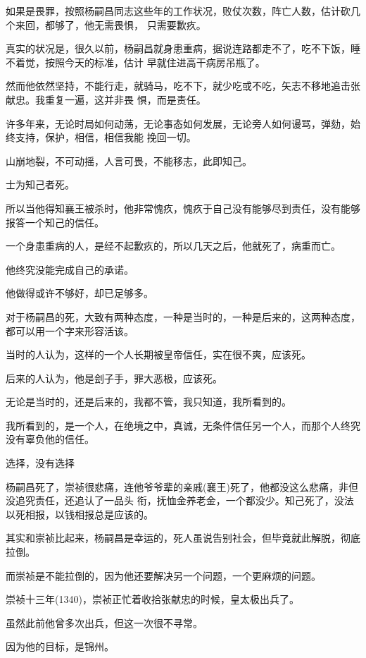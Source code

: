 \documentclass[11pt,a4paper,onecolumn]{article}
\begin{document}
如果是畏罪，按照杨嗣昌同志这些年的工作状况，败仗次数，阵亡人数，估计砍几个来回，都够了，他无需畏惧，
只需要歉疚。

真实的状况是，很久以前，杨嗣昌就身患重病，据说连路都走不了，吃不下饭，睡不着觉，按照今天的标准，估计
早就住进高干病房吊瓶了。

然而他依然坚持，不能行走，就骑马，吃不下，就少吃或不吃，矢志不移地追击张献忠。我重复一遍，这并非畏
惧，而是责任。

许多年来，无论时局如何动荡，无论事态如何发展，无论旁人如何谩骂，弹劾，始终支持，保护，相信，相信我能
挽回一切。

山崩地裂，不可动摇，人言可畏，不能移志，此即知己。

士为知己者死。

所以当他得知襄王被杀时，他非常愧疚，愧疚于自己没有能够尽到责任，没有能够报答一个知己的信任。

一个身患重病的人，是经不起歉疚的，所以几天之后，他就死了，病重而亡。

他终究没能完成自己的承诺。

他做得或许不够好，却已足够多。

对于杨嗣昌的死，大致有两种态度，一种是当时的，一种是后来的，这两种态度，都可以用一个字来形容\myrule 活该。

当时的人认为，这样的一个人长期被皇帝信任，实在很不爽，应该死。

后来的人认为，他是刽子手，罪大恶极，应该死。

无论是当时的，还是后来的，我都不管，我只知道，我所看到的。

我所看到的，是一个人，在绝境之中，真诚，无条件信任另一个人，而那个人终究没有辜负他的信任。

选择，没有选择

杨嗣昌死了，崇祯很悲痛，连他爷爷辈的亲戚(襄王)死了，他都没这么悲痛，非但没追究责任，还追认了一品头
衔，抚恤金养老金，一个都没少。知己死了，没法以死相报，以钱相报总是应该的。

其实和崇祯比起来，杨嗣昌是幸运的，死人虽说告别社会，但毕竟就此解脱，彻底拉倒。

而崇祯是不能拉倒的，因为他还要解决另一个问题，一个更麻烦的问题。

崇祯十三年(1340)，崇祯正忙着收拾张献忠的时候，皇太极出兵了。

虽然此前他曾多次出兵，但这一次很不寻常。

因为他的目标，是锦州。

\section[\thesection]{}
\end{document}
